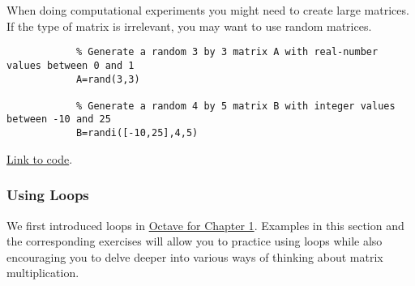 \documentclass{ximera}
\begin{document}
    \begin{template}\label{temp:randMat}
        When doing computational experiments you might need to create large matrices.  If the type of matrix is irrelevant, you may want to use random matrices.
    
        \begin{verbatim}
            % Generate a random 3 by 3 matrix A with real-number values between 0 and 1
            A=rand(3,3)
            
            % Generate a random 4 by 5 matrix B with integer values between -10 and 25
            B=randi([-10,25],4,5)
        \end{verbatim}
    
    \href{https://sagecell.sagemath.org/?z=eJxtzLEKwjAUheE9kHc4S6GFFGzTjA7t0ocQhxu8aKCJEFNb397U4qTLGX44X4GRA0dKDEKkcLl7aNhXHk8puhU9FpduiExTHWZvOeJJ08wPWE4Lc8AB-YdGiv64CaVWupJCiuKP3W22-drDbruQ-Prr1s0ut0aK4UO78pSjas1ZdcpUb3XOOqE=&lang=octave&interacts=eJyLjgUAARUAuQ==}{Link to code}.    
    \end{template}

    \subsubsection*{Using Loops}

    We first introduced loops in \href{https://ximera.osu.edu/linearalgebradzv3/xOctave/OCT_vectors/main}{Octave for Chapter 1}.  Examples in this section and the corresponding exercises will allow you to practice using loops while also encouraging you to delve deeper into various ways of thinking about matrix multiplication. 
\end{document}
